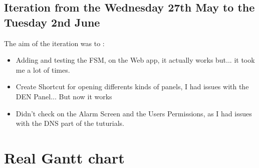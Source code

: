 \documentclass[a4paper, 10pt]{article}
\begin{document}
\subsection{Iteration from the Wednesday 27th May to the Tuesday 2nd June}
The aim of the iteration was to :
\begin{itemize}
    \item Adding and testing the FSM, on the Web app, it actually works but... it took me a lot of times.
    \item Create Shortcut for opening differents kinds of panels, I had issues with the DEN Panel... But now it works
    \item Didn't check on the Alarm Screen and the Users Permissions, as I had issues with the DNS part of the tuturials.
\end{itemize}

\newpage
\section{Real Gantt chart}
\end{document}
